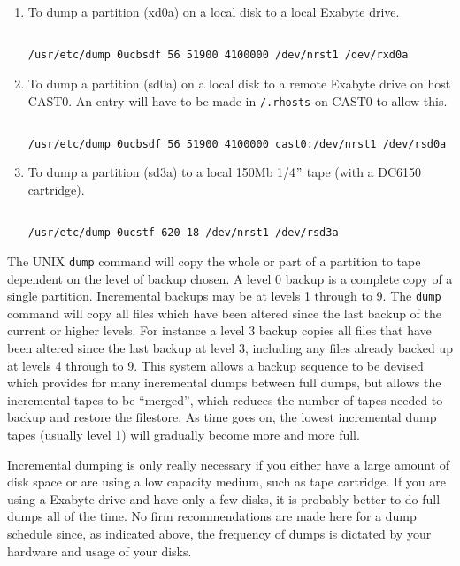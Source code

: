 \begin{enumerate}

\item To dump a partition (xd0a) on a local disk to a local Exabyte drive.

\begin{verbatim}

/usr/etc/dump 0ucbsdf 56 51900 4100000 /dev/nrst1 /dev/rxd0a

\end{verbatim}

\item To dump a partition (sd0a) on a local disk to a remote Exabyte drive on
host CAST0. An entry will have to be made in {\tt /.rhosts} on CAST0 to allow this.

\begin{verbatim}

/usr/etc/dump 0ucbsdf 56 51900 4100000 cast0:/dev/nrst1 /dev/rsd0a

\end{verbatim}

 \item To dump a partition (sd3a) to a local 150Mb 1/4$"$ tape (with a DC6150
cartridge).

\begin{verbatim}

/usr/etc/dump 0ucstf 620 18 /dev/nrst1 /dev/rsd3a

\end{verbatim}

\end{enumerate}

The UNIX {\tt dump} command will copy the whole or part of a partition to tape
dependent on the level of backup chosen. A level 0 backup is a complete 
copy of a single partition. Incremental backups may be at levels 1 through
to 9. The {\tt dump} command will copy all files which have been altered since
the last backup of the current or higher levels. For instance a level 3
backup copies all files that have been altered since the last backup at level
3, including any files already backed up at levels 4 through to 9. This system
allows a backup sequence to be devised which provides for many incremental
dumps between full dumps, but allows the incremental tapes to be
``merged'', which reduces the number of tapes needed to backup and restore the
filestore. As time goes on, the lowest incremental dump tapes (usually level 1)
will gradually become more and more full.

Incremental dumping is only really necessary if you either have a large amount 
of disk space or are using a low capacity medium, such as tape cartridge.
If you are using a Exabyte drive and have only a few disks, it is probably
better to do full dumps all of the time. No firm recommendations are made here
for a dump schedule since, as indicated above, the frequency of dumps is
dictated by your hardware and usage of your disks.

